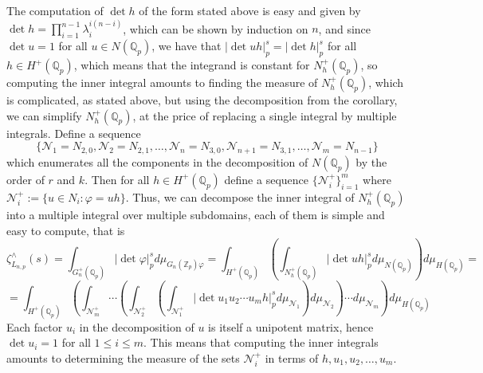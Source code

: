 \documentclass[12pt]{article}
\begin{document}
The computation of $\det{h}$ of the form stated above is easy and given by $\det{h}=\prod_{i=1}^{n-1}\lambda_i^{i(n-i)}$, which can be shown by induction on $n$, and since $\det{u}=1$ for all $u\in{N(\mathbb{Q}_{p})}$, we have that $|\det{uh}|_p^s=|\det{h}|_p^s$
for all $h\in{H}^{+}(\mathbb{Q}_{p})$, which means that the integrand is constant for $N_{h}^{+}(\mathbb{Q}_{p})$, so computing the inner integral amounts to finding the measure of $N_{h}^+(\mathbb{Q}_p)$, which is complicated, as stated above, but using the decomposition from the corollary, we can simplify $N_{h}^{+}(\mathbb{Q}_{p})$, at the price of replacing a single integral by multiple integrals. Define a sequence \[\{\mathcal{N}_{1}=N_{2,0},\mathcal{N}_{2}=N_{2,1},\dots,\mathcal{N}_{n}=N_{3,0},\mathcal{N}_{n+1}=N_{3,1},\dots,\mathcal{N}_{m}=N_{n-1}\}\]
which enumerates all the components in the decomposition of $N(\mathbb{Q}_{p})$ by the order of $r$ and $k$. Then for all $h\in{H^{+}(\mathbb{Q}_{p})}$ define a sequence $\{\mathcal{N}_{i}^{+}\}_{i=1}^{m}$ where $\mathcal{N}_{i}^{+}:=\{u\in{N_{i}} : \varphi=uh\}$. Thus, we can decompose the inner integral of $N_{h}^{+}(\mathbb{Q}_{p})$ into a multiple integral over multiple subdomains, each of them is simple and easy to compute, that is
\[\zeta_{L_{n,p}}^{\wedge}(s)=\displaystyle\int_{G_{n}^{+}(\mathbb{Q}_p)}|\det\varphi|_p^sd\mu_{G_{n}(\mathbb{Z}_p)\varphi}=\displaystyle\int_{H^+(\mathbb{Q}_p)}\left(\displaystyle\int_{N_{h}^+(\mathbb{Q}_p)}|\det{uh}|_p^sd\mu_{N(\mathbb{Q}_p)}\right)d\mu_{H(\mathbb{Q}_p)}=\]\[=\displaystyle\int_{H^+(\mathbb{Q}_p)}\left(\displaystyle\int_{\mathcal{N}^+_{m}}\cdots\left(\displaystyle\int_{\mathcal{N}^+_2}\left(\displaystyle\int_{\mathcal{N}^+_1}|\det{u_{1}u_{2}\cdots{u_{m}}h}|_p^sd\mu_{\mathcal{N}_1}\right)d\mu_{\mathcal{N}_2}\right)\cdots d\mu_{\mathcal{N}_{m}}\right)d\mu_{H(\mathbb{Q}_p)}\]
Each factor $u_{i}$ in the decomposition of $u$ is itself a unipotent matrix, hence $\det{u_{i}}=1$ for all $1\leq{i}\leq{m}$.
This means that computing the inner integrals amounts to determining the measure of the sets $\mathcal{N}^+_i$ in terms of $h,u_1,u_2,\dots,u_{m}$.
\end{document}
